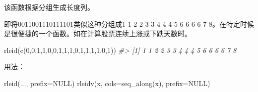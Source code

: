 \documentclass[
]{book}
\newenvironment{Shaded}{\begin{snugshade}}{\end{snugshade}}
\newcommand{\AttributeTok}[1]{\textcolor[rgb]{0.77,0.63,0.00}{#1}}
\newcommand{\CommentTok}[1]{\textcolor[rgb]{0.56,0.35,0.01}{\textit{#1}}}
\newcommand{\ConstantTok}[1]{\textcolor[rgb]{0.00,0.00,0.00}{#1}}
\newcommand{\DecValTok}[1]{\textcolor[rgb]{0.00,0.00,0.81}{#1}}
\newcommand{\FunctionTok}[1]{\textcolor[rgb]{0.00,0.00,0.00}{#1}}
\newcommand{\NormalTok}[1]{#1}
\newcommand{\OtherTok}[1]{\textcolor[rgb]{0.56,0.35,0.01}{#1}}
\newcommand{\SpecialCharTok}[1]{\textcolor[rgb]{0.00,0.00,0.00}{#1}}
\newcommand{\StringTok}[1]{\textcolor[rgb]{0.31,0.60,0.02}{#1}}
\begin{document}
该函数根据分组生成长度列。

即将0011001110111101类似这种分组成1 1 2 2 3 3 4 4 4 5 6 6 6 6 7 8。在特定时候是很便捷的一个函数。如在计算股票连续上涨或下跌天数时。

\begin{Shaded}
\begin{Highlighting}[]
\FunctionTok{rleid}\NormalTok{(}\FunctionTok{c}\NormalTok{(}\DecValTok{0}\NormalTok{,}\DecValTok{0}\NormalTok{,}\DecValTok{1}\NormalTok{,}\DecValTok{1}\NormalTok{,}\DecValTok{0}\NormalTok{,}\DecValTok{0}\NormalTok{,}\DecValTok{1}\NormalTok{,}\DecValTok{1}\NormalTok{,}\DecValTok{1}\NormalTok{,}\DecValTok{0}\NormalTok{,}\DecValTok{1}\NormalTok{,}\DecValTok{1}\NormalTok{,}\DecValTok{1}\NormalTok{,}\DecValTok{1}\NormalTok{,}\DecValTok{0}\NormalTok{,}\DecValTok{1}\NormalTok{))}
\CommentTok{\#\textgreater{}  [1] 1 1 2 2 3 3 4 4 4 5 6 6 6 6 7 8}
\end{Highlighting}
\end{Shaded}

用法：

\begin{Shaded}
\begin{Highlighting}[]
\FunctionTok{rleid}\NormalTok{(..., }\AttributeTok{prefix=}\ConstantTok{NULL}\NormalTok{)}
\FunctionTok{rleidv}\NormalTok{(x, }\AttributeTok{cols=}\FunctionTok{seq\_along}\NormalTok{(x), }\AttributeTok{prefix=}\ConstantTok{NULL}\NormalTok{)}
\end{Highlighting}
\end{Shaded}

\begin{Shaded}
\end{Shaded}
\end{document}
